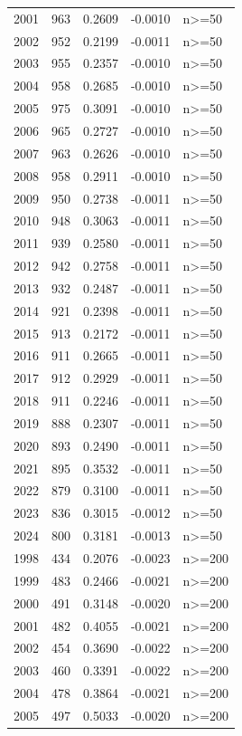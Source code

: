 \begin{tabular}{rrrrl}
2001 & 963 & 0.2609 & -0.0010 & n>=50 \\
2002 & 952 & 0.2199 & -0.0011 & n>=50 \\
2003 & 955 & 0.2357 & -0.0010 & n>=50 \\
2004 & 958 & 0.2685 & -0.0010 & n>=50 \\
2005 & 975 & 0.3091 & -0.0010 & n>=50 \\
2006 & 965 & 0.2727 & -0.0010 & n>=50 \\
2007 & 963 & 0.2626 & -0.0010 & n>=50 \\
2008 & 958 & 0.2911 & -0.0010 & n>=50 \\
2009 & 950 & 0.2738 & -0.0011 & n>=50 \\
2010 & 948 & 0.3063 & -0.0011 & n>=50 \\
2011 & 939 & 0.2580 & -0.0011 & n>=50 \\
2012 & 942 & 0.2758 & -0.0011 & n>=50 \\
2013 & 932 & 0.2487 & -0.0011 & n>=50 \\
2014 & 921 & 0.2398 & -0.0011 & n>=50 \\
2015 & 913 & 0.2172 & -0.0011 & n>=50 \\
2016 & 911 & 0.2665 & -0.0011 & n>=50 \\
2017 & 912 & 0.2929 & -0.0011 & n>=50 \\
2018 & 911 & 0.2246 & -0.0011 & n>=50 \\
2019 & 888 & 0.2307 & -0.0011 & n>=50 \\
2020 & 893 & 0.2490 & -0.0011 & n>=50 \\
2021 & 895 & 0.3532 & -0.0011 & n>=50 \\
2022 & 879 & 0.3100 & -0.0011 & n>=50 \\
2023 & 836 & 0.3015 & -0.0012 & n>=50 \\
2024 & 800 & 0.3181 & -0.0013 & n>=50 \\
1998 & 434 & 0.2076 & -0.0023 & n>=200 \\
1999 & 483 & 0.2466 & -0.0021 & n>=200 \\
2000 & 491 & 0.3148 & -0.0020 & n>=200 \\
2001 & 482 & 0.4055 & -0.0021 & n>=200 \\
2002 & 454 & 0.3690 & -0.0022 & n>=200 \\
2003 & 460 & 0.3391 & -0.0022 & n>=200 \\
2004 & 478 & 0.3864 & -0.0021 & n>=200 \\
2005 & 497 & 0.5033 & -0.0020 & n>=200 \\

\end{tabular}
